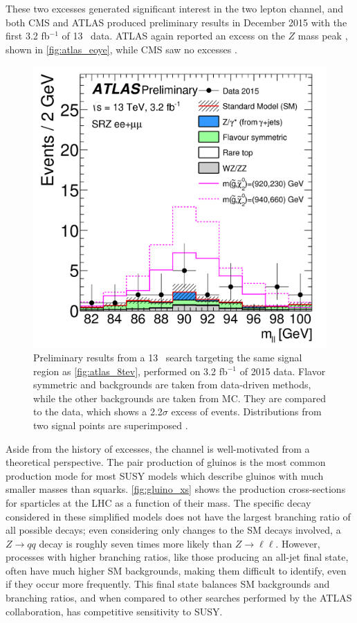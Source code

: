 These two excesses generated significant interest in the two lepton channel, and both \ac{CMS} and ATLAS produced preliminary results in December 2015 with the first 3.2 fb$^{-1}$ of 13 \tev~data. ATLAS again reported an excess on the $Z$ mass peak \cite{ATLAS-CONF-2015-082}, shown in \autoref{fig:atlas_eoye}, while \ac{CMS} saw no excesses \cite{CMS-PAS-SUS-15-011}. 

\begin{centering}
\begin{figure}[!hbt]
\myfloatalign
\includegraphics[width=.9\linewidth]{figures/theory/fig_05.png}
\caption{ Preliminary results from a 13 \tev~search targeting the same signal region as \autoref{fig:atlas_8tev}, performed on 3.2 fb$^{-1}$ of 2015 data. Flavor symmetric and \dyjets backgrounds are taken from data-driven methods, while the other backgrounds are taken from \ac{MC}. They are compared to the data, which shows a 2.2$\sigma$ excess of events. Distributions from two signal points are superimposed \cite{ATLAS-CONF-2015-082}.}
\label{fig:atlas_eoye}
\end{figure}
\end{centering}

Aside from the history of excesses, the channel is well-motivated from a theoretical perspective. The pair production of gluinos is the most common production mode for most \ac{SUSY} models which describe gluinos with much smaller masses than squarks. \autoref{fig:gluino_xs} shows the production cross-sections for sparticles at the \ac{LHC} as a function of their mass. The specific decay considered in these simplified models does not have the largest branching ratio of all possible decays; even considering only changes to the \ac{SM} decays involved, a $Z\rightarrow qq$ decay is roughly seven times more likely than $Z\rightarrow\ell\ell$. However, processes with higher branching ratios, like those producing an all-jet final state, often have much higher \ac{SM} backgrounds, making them difficult to identify, even if they occur more frequently. This final state balances \ac{SM} backgrounds and branching ratios, and when compared to other searches performed by the ATLAS collaboration, has competitive sensitivity to \ac{SUSY}. 

